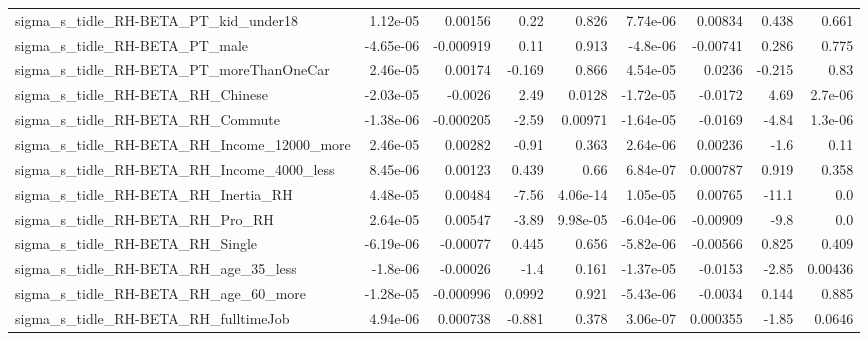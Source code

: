 \begin{tabular}{lrrrrrrrr}
sigma\_s\_tidle\_RH-BETA\_PT\_kid\_under18               &    1.12e-05 &      0.00156 &     0.22 &    0.826 &   7.74e-06 &     0.00834 &        0.438 &         0.661 \\
sigma\_s\_tidle\_RH-BETA\_PT\_male                      &   -4.65e-06 &    -0.000919 &     0.11 &    0.913 &   -4.8e-06 &    -0.00741 &        0.286 &         0.775 \\
sigma\_s\_tidle\_RH-BETA\_PT\_moreThanOneCar            &    2.46e-05 &      0.00174 &   -0.169 &    0.866 &   4.54e-05 &      0.0236 &       -0.215 &          0.83 \\
sigma\_s\_tidle\_RH-BETA\_RH\_Chinese                   &   -2.03e-05 &      -0.0026 &     2.49 &   0.0128 &  -1.72e-05 &     -0.0172 &         4.69 &       2.7e-06 \\
sigma\_s\_tidle\_RH-BETA\_RH\_Commute                   &   -1.38e-06 &    -0.000205 &    -2.59 &  0.00971 &  -1.64e-05 &     -0.0169 &        -4.84 &       1.3e-06 \\
sigma\_s\_tidle\_RH-BETA\_RH\_Income\_12000\_more         &    2.46e-05 &      0.00282 &    -0.91 &    0.363 &   2.64e-06 &     0.00236 &         -1.6 &          0.11 \\
sigma\_s\_tidle\_RH-BETA\_RH\_Income\_4000\_less          &    8.45e-06 &      0.00123 &    0.439 &     0.66 &   6.84e-07 &    0.000787 &        0.919 &         0.358 \\
sigma\_s\_tidle\_RH-BETA\_RH\_Inertia\_RH                &    4.48e-05 &      0.00484 &    -7.56 & 4.06e-14 &   1.05e-05 &     0.00765 &        -11.1 &           0.0 \\
sigma\_s\_tidle\_RH-BETA\_RH\_Pro\_RH                    &    2.64e-05 &      0.00547 &    -3.89 & 9.98e-05 &  -6.04e-06 &    -0.00909 &         -9.8 &           0.0 \\
sigma\_s\_tidle\_RH-BETA\_RH\_Single                    &   -6.19e-06 &     -0.00077 &    0.445 &    0.656 &  -5.82e-06 &    -0.00566 &        0.825 &         0.409 \\
sigma\_s\_tidle\_RH-BETA\_RH\_age\_35\_less               &    -1.8e-06 &     -0.00026 &     -1.4 &    0.161 &  -1.37e-05 &     -0.0153 &        -2.85 &       0.00436 \\
sigma\_s\_tidle\_RH-BETA\_RH\_age\_60\_more               &   -1.28e-05 &    -0.000996 &   0.0992 &    0.921 &  -5.43e-06 &     -0.0034 &        0.144 &         0.885 \\
sigma\_s\_tidle\_RH-BETA\_RH\_fulltimeJob               &    4.94e-06 &     0.000738 &   -0.881 &    0.378 &   3.06e-07 &    0.000355 &        -1.85 &        0.0646 \\

\end{tabular}

